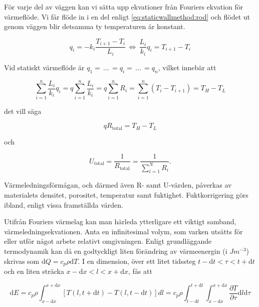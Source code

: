 För varje del av väggen kan vi sätta upp ekvationer från Fouriers ekvation för värmeflöde. Vi får flöde in i en del enligt \eqref{eq:staticwallmethod:rod} och flödet ut genom väggen blir detsamma ty temperaturen är konstant.

\begin{equation}
\label{eq:staticwallmethod:rod}
q_i = -k_i\frac{T_{i+1}-T_{i}}{L_i} \, \Leftrightarrow \, \frac{L_i}{k_i}q_i = T_{i+1}-T_{i}
\end{equation}

Vid statiskt värmeflöde är $q_1 = \, ... \, = q_i = \, ... \, = q_n$, vilket innebär att

\begin{equation}
\sum_{i=1}^n \frac{L_i}{k_i}q_i = q\sum_{i=1}^n \frac{L_i}{k_i} = q\sum_{i=1}^n R_i = \sum_{i=1}^n \left( T_{i}-T_{i+1} \right) = T_H - T_L 
\end{equation}

det vill säga

\begin{equation}
q R_\text{total} = T_H - T_L
\end{equation}

och

\begin{equation}
U_\text{total} = \frac{1}{R_\text{total}} = \frac{1}{\sum_{i=1}^N R_i}.
\end{equation}

Värmeledningsförmågan, och därmed även R- samt U-värden, påverkas av materialets densitet, porositet, temperatur samt fuktighet. Fuktkorrigering görs ibland, enligt vissa framställda värden.

Utifrån Fouriers värmelag kan man härleda ytterligare ett viktigt samband, värmeledningsekvationen. Anta en infinitesimal volym, som varken utsätts för eller utför något arbete relativt omgivningen. Enligt grundläggande termodynamik kan då en godtyckligt liten förändring av värmeenergin (i $\unit{J m^{-3}}$) skrivas som $\mathrm{d}Q = c_p \rho \mathrm{d}T$.  I en dimension, över ett litet tidssteg $t-\mathrm{d}t< \tau < t+\mathrm{d}t$ och en liten sträcka $x-\mathrm{d}x < l < x+\mathrm{d}x$, fås att

\begin{equation}
\mathrm{d}E = c_p \rho \int_{x-\mathrm{d}x}^{x+\mathrm{d}x} \left[ T\left( l, t+\mathrm{d}t\right) - T\left( l, t-\mathrm{d}t\right)\right]dl = c_p \rho \int_{t-\mathrm{d}t}^{t+\mathrm{d}t} \int_{x-\mathrm{d}x}^{x+\mathrm{d}x} \frac{\partial T}{\partial \tau} \mathrm{d}l\mathrm{d}\tau
\end{equation}

